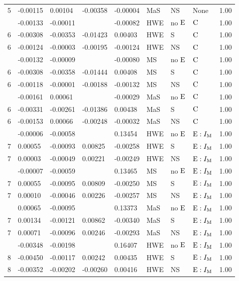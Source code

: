 \begin{longtable}[t]{lllllllll}
5 & -0.00115 & 0.00104 & -0.00358 & -0.00004 & MaS & NS & None & 1.00\\
\addlinespace
6 & -0.00133 & -0.00011 &  & -0.00082 & HWE & no ${\rm E}$ & ${\rm C}$ & 1.00\\
6 & -0.00308 & -0.00353 & -0.01423 & 0.00403 & HWE & S & ${\rm C}$ & 1.00\\
6 & -0.00124 & -0.00003 & -0.00195 & -0.00124 & HWE & NS & ${\rm C}$ & 1.00\\
\addlinespace
6 & -0.00132 & -0.00009 &  & -0.00080 & MS & no ${\rm E}$ & ${\rm C}$ & 1.00\\
6 & -0.00308 & -0.00358 & -0.01444 & 0.00408 & MS & S & ${\rm C}$ & 1.00\\
6 & -0.00118 & -0.00001 & -0.00188 & -0.00132 & MS & NS & ${\rm C}$ & 1.00\\
\addlinespace
6 & -0.00161 & 0.00061 &  & -0.00029 & MaS & no ${\rm E}$ & ${\rm C}$ & 1.00\\
6 & -0.00331 & -0.00261 & -0.01386 & 0.00438 & MaS & S & ${\rm C}$ & 1.00\\
6 & -0.00153 & 0.00066 & -0.00248 & -0.00032 & MaS & NS & ${\rm C}$ & 1.00\\
\addlinespace
7 & -0.00006 & -0.00058 &  & 0.13454 & HWE & no ${\rm E}$ & ${\rm E}:I_{{\rm M}}$ & 1.00\\
7 & 0.00055 & -0.00093 & 0.00825 & -0.00258 & HWE & S & ${\rm E}:I_{{\rm M}}$ & 1.00\\
7 & 0.00003 & -0.00049 & 0.00221 & -0.00249 & HWE & NS & ${\rm E}:I_{{\rm M}}$ & 1.00\\
\addlinespace
7 & -0.00007 & -0.00059 &  & 0.13465 & MS & no ${\rm E}$ & ${\rm E}:I_{{\rm M}}$ & 1.00\\
7 & 0.00055 & -0.00095 & 0.00809 & -0.00250 & MS & S & ${\rm E}:I_{{\rm M}}$ & 1.00\\
7 & 0.00010 & -0.00046 & 0.00226 & -0.00257 & MS & NS & ${\rm E}:I_{{\rm M}}$ & 1.00\\
\addlinespace
7 & 0.00065 & -0.00095 &  & 0.13373 & MaS & no ${\rm E}$ & ${\rm E}:I_{{\rm M}}$ & 1.00\\
7 & 0.00134 & -0.00121 & 0.00862 & -0.00340 & MaS & S & ${\rm E}:I_{{\rm M}}$ & 1.00\\
7 & 0.00071 & -0.00096 & 0.00246 & -0.00293 & MaS & NS & ${\rm E}:I_{{\rm M}}$ & 1.00\\
\addlinespace
8 & -0.00348 & -0.00198 &  & 0.16407 & HWE & no ${\rm E}$ & ${\rm E}:I_{{\rm M}}$ & 1.00\\
8 & -0.00450 & -0.00117 & 0.00242 & 0.00435 & HWE & S & ${\rm E}:I_{{\rm M}}$ & 1.00\\
8 & -0.00352 & -0.00202 & -0.00260 & 0.00416 & HWE & NS & ${\rm E}:I_{{\rm M}}$ & 1.00\\

\end{longtable}
